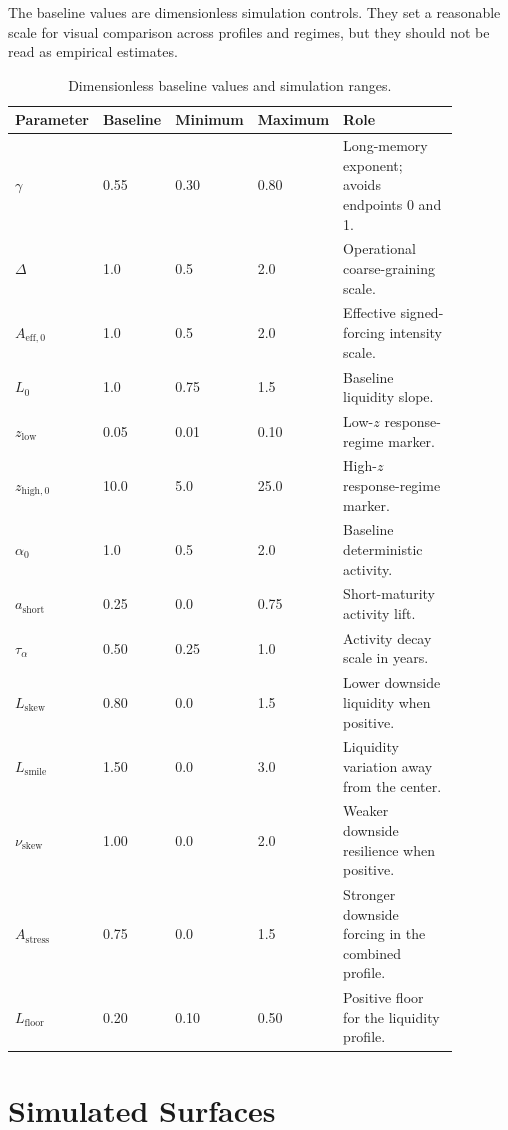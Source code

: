 \documentclass[11pt]{article}
\begin{document}
The baseline values are dimensionless simulation controls. They set a
reasonable scale for visual comparison across profiles and regimes, but they
should not be read as empirical estimates.

\begin{table}[ht]
\centering
\small
\caption{Dimensionless baseline values and simulation ranges.}
\label{tab:parameter-ranges}
\begin{tabular}{p{0.18\linewidth}p{0.13\linewidth}p{0.13\linewidth}p{0.13\linewidth}p{0.31\linewidth}}
\toprule
Parameter & Baseline & Minimum & Maximum & Role \\
\midrule
\(\gamma\) & 0.55 & 0.30 & 0.80 & Long-memory exponent; avoids endpoints 0 and 1. \\
\(\Delta\) & 1.0 & 0.5 & 2.0 & Operational coarse-graining scale. \\
\(A_{\mathrm{eff},0}\) & 1.0 & 0.5 & 2.0 & Effective signed-forcing intensity scale. \\
\(L_0\) & 1.0 & 0.75 & 1.5 & Baseline liquidity slope. \\
\(z_{\mathrm{low}}\) & 0.05 & 0.01 & 0.10 & Low-\(z\) response-regime marker. \\
\(z_{\mathrm{high},0}\) & 10.0 & 5.0 & 25.0 & High-\(z\) response-regime marker. \\
\(\alpha_0\) & 1.0 & 0.5 & 2.0 & Baseline deterministic activity. \\
\(a_{\mathrm{short}}\) & 0.25 & 0.0 & 0.75 & Short-maturity activity lift. \\
\(\tau_\alpha\) & 0.50 & 0.25 & 1.0 & Activity decay scale in years. \\
\(L_{\mathrm{skew}}\) & 0.80 & 0.0 & 1.5 & Lower downside liquidity when positive. \\
\(L_{\mathrm{smile}}\) & 1.50 & 0.0 & 3.0 & Liquidity variation away from the center. \\
\(\nu_{\mathrm{skew}}\) & 1.00 & 0.0 & 2.0 & Weaker downside resilience when positive. \\
\(A_{\mathrm{stress}}\) & 0.75 & 0.0 & 1.5 & Stronger downside forcing in the combined profile. \\
\(L_{\mathrm{floor}}\) & 0.20 & 0.10 & 0.50 & Positive floor for the liquidity profile. \\
\bottomrule
\end{tabular}
\end{table}

\FloatBarrier

\section{Simulated Surfaces}
\end{document}

